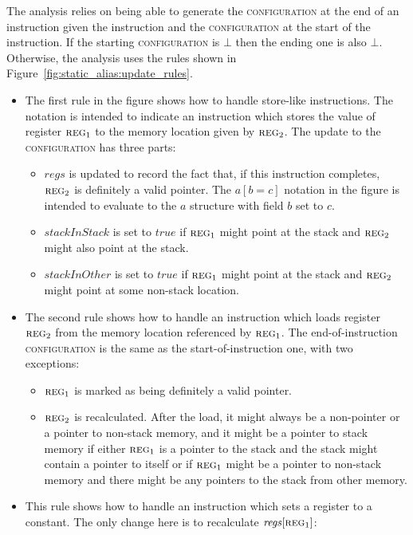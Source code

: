 The analysis relies on being able to generate the
\textsc{configuration} at the end of an instruction given the
instruction and the \textsc{configuration} at the start of the
instruction.  If the starting \textsc{configuration} is $\bot$ then
the ending one is also $\bot$.  Otherwise, the analysis uses the rules
shown in Figure~\ref{fig:static_alias:update_rules}.

\begin{itemize}
\item[\circled{1}] The first rule in the figure shows how to handle
  store-like instructions.  The notation is intended to indicate an
  instruction which stores the value of register $\textsc{reg}_1$ to
  the memory location given by $\textsc{reg}_2$.  The update to the
  \textsc{configuration} has three parts:

  \begin{itemize}
  \item $\mathit{regs}$ is updated to record the fact that, if this
    instruction completes, $\textsc{reg}_2$ is definitely a valid
    pointer.  The $a[b = c]$ notation in the figure is intended to
    evaluate to the $a$ structure with field $b$ set to $c$.
  \item $\mathit{stackInStack}$ is set to $\mathit{true}$ if
    $\textsc{reg}_1$ might point at the stack and $\textsc{reg}_2$
    might also point at the stack.
  \item $\mathit{stackInOther}$ is set to $\mathit{true}$ if
    $\textsc{reg}_1$ might point at the stack and $\textsc{reg}_2$
    might point at some non-stack location.
  \end{itemize}
\item[\circled{2}] The second rule shows how to handle an instruction
  which loads register $\textsc{reg}_2$ from the memory location
  referenced by $\textsc{reg}_1$.  The end-of-instruction
  \textsc{configuration} is the same as the start-of-instruction one,
  with two exceptions:

  \begin{itemize}
  \item $\textsc{reg}_1$ is marked as being definitely a valid pointer.
  \item $\textsc{reg}_2$ is recalculated.  After the load, it might
    always be a non-pointer or a pointer to non-stack memory, and it
    might be a pointer to stack memory if either $\textsc{reg}_1$ is a
    pointer to the stack and the stack might contain a pointer to
    itself or if $\textsc{reg}_1$ might be a pointer to non-stack
    memory and there might be any pointers to the stack from other
    memory.
  \end{itemize}
\item[\circled{3}] This rule shows how to handle an instruction which
  sets a register to a constant.  The only change here is to
  recalculate $\mathit{regs}[\textsc{reg}_1]$:


\end{itemize}
